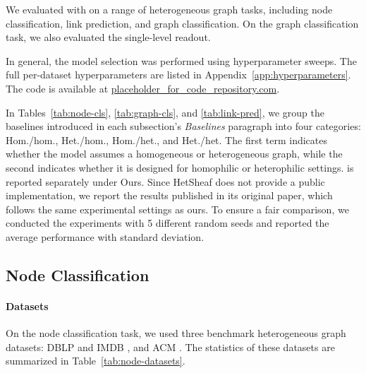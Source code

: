 We evaluated \method{} with \ampss{} on a range of heterogeneous graph tasks, including node classification, link prediction, and graph classification. On the graph classification task, we also evaluated the single-level \sheafconvpool{} readout.

In general, the model selection was performed using hyperparameter sweeps. The full per-dataset hyperparameters are listed in Appendix~\ref{app:hyperparameters}. The code is available at \url{placeholder_for_code_repository.com}.

In Tables~\ref{tab:node-cls}, \ref{tab:graph-cls}, and \ref{tab:link-pred}, we group the baselines introduced in each subsection’s \emph{Baselines} paragraph into four categories: Hom./hom., Het./hom., Hom./het., and Het./het. The first term indicates whether the model assumes a homogeneous or heterogeneous graph, while the second indicates whether it is designed for homophilic or heterophilic settings. \method{} is reported separately under Ours. Since HetSheaf does not provide a public implementation, we report the results published in its original paper, which follows the same experimental settings as ours. To ensure a fair comparison, we conducted the experiments with 5 different random seeds and reported the average performance with standard deviation.


\subsection{Node Classification}
\label{sec:setup-node}


\paragraph{Datasets}
On the node classification task, we used three benchmark heterogeneous graph datasets: DBLP \cite{lv2021hgb} and IMDB \cite{lv2021hgb}, and ACM \cite{wang2019han}. The statistics of these datasets are summarized in Table~\ref{tab:node-datasets}.

\begin{table}[H]
  \centering
  \caption{Node-classification datasets and their semantic meta-paths. The N column indicates nodes, E indicates the number of edges, and C indicates classes.}
  \label{tab:node-datasets}
  \scriptsize
\end{table}


